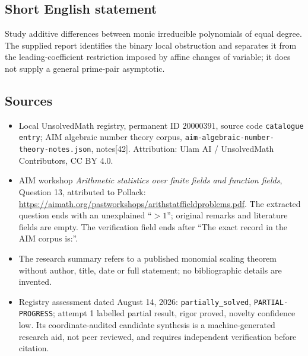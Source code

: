 \documentclass[11pt]{article}
\begin{document}
\subsection{Short English statement}
Study additive differences between monic irreducible polynomials of equal degree. The supplied report identifies the binary local obstruction and separates it from the leading-coefficient restriction imposed by affine changes of variable; it does not supply a general prime-pair asymptotic.
\subsection{Sources}
\begin{itemize}
\item Local UnsolvedMath registry, permanent ID \(20000391\), source code \texttt{catalogue entry}; AIM algebraic number theory corpus, \texttt{aim-algebraic-number-theory-notes.json}, notes[42]. Attribution: Ulam AI / UnsolvedMath Contributors, CC BY 4.0.
\item AIM workshop \emph{Arithmetic statistics over finite fields and function fields}, Question 13, attributed to Pollack: \url{https://aimath.org/pastworkshops/arithstatffieldproblems.pdf}. The extracted question ends with an unexplained ``\(>1\)''; original remarks and literature fields are empty. The verification field ends after ``The exact record in the AIM corpus is:''.
\item The research summary refers to a published monomial scaling theorem without author, title, date or full statement; no bibliographic details are invented.
\item Registry assessment dated August 14, 2026: \texttt{partially\_solved}, \texttt{PARTIAL-PROGRESS}; attempt 1 labelled partial result, rigor proved, novelty confidence low. Its coordinate-audited candidate synthesis is a machine-generated research aid, not peer reviewed, and requires independent verification before citation.
\end{itemize}
\end{document}
